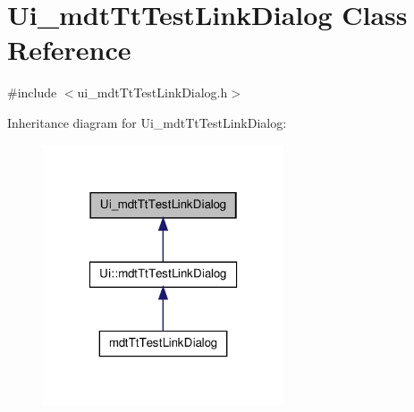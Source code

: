 \hypertarget{class_ui__mdt_tt_test_link_dialog}{\section{Ui\-\_\-mdt\-Tt\-Test\-Link\-Dialog Class Reference}
\label{class_ui__mdt_tt_test_link_dialog}
}


{\ttfamily \#include $<$ui\-\_\-mdt\-Tt\-Test\-Link\-Dialog.\-h$>$}



Inheritance diagram for Ui\-\_\-mdt\-Tt\-Test\-Link\-Dialog\-:
\nopagebreak
\begin{figure}[H]
\begin{center}
\leavevmode
\includegraphics[width=202pt]{class_ui__mdt_tt_test_link_dialog__inherit__graph}
\end{center}
\end{figure}


